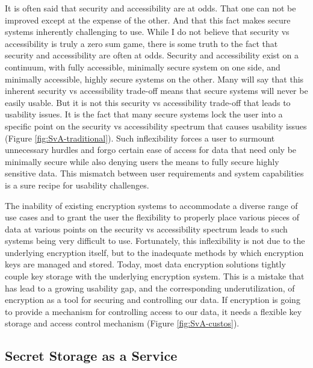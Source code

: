 It is often said that security and accessibility are at odds. That one
can not be improved except at the expense of the other. And that this
fact makes secure systems inherently challenging to use. While I do
not believe that security vs accessibility is truly a zero sum game,
there is some truth to the fact that security and accessibility are
often at odds. Security and accessibility exist on a continuum, with
fully accessible, minimally secure system on one side, and minimally
accessible, highly secure systems on the other. Many will say that
this inherent security vs accessibility trade-off means that secure
systems will never be easily usable. But it is not this security vs
accessibility trade-off that leads to usability issues. It is the fact
that many secure systems lock the user into a specific point on the
security vs accessibility spectrum that causes usability issues
(Figure \ref{fig:SvA-traditional}). Such inflexibility forces a user
to surmount unnecessary hurdles and forgo certain ease of access for
data that need only be minimally secure while also denying users the
means to fully secure highly sensitive data. This mismatch between
user requirements and system capabilities is a sure recipe for
usability challenges.

The inability of existing encryption systems to accommodate a diverse
range of use cases and to grant the user the flexibility to properly
place various pieces of data at various points on the security vs
accessibility spectrum leads to such systems being very difficult to
use. Fortunately, this inflexibility is not due to the underlying
encryption itself, but to the inadequate methods by which encryption
keys are managed and stored. Today, most data encryption solutions
tightly couple key storage with the underlying encryption system. This
is a mistake that has lead to a growing usability gap, and the
corresponding underutilization, of encryption as a tool for securing
and controlling our data. If encryption is going to provide a
mechanism for controlling access to our data, it needs a flexible key
storage and access control mechanism (Figure \ref{fig:SvA-custos}).

\subsection{Secret Storage as a Service}

